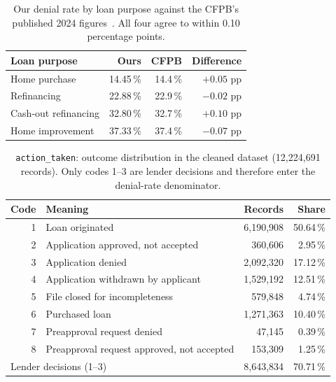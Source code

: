 \documentclass[sigconf,balance=false]{acmart}
\begin{document}
\begin{table}[t]
\caption{Our denial rate by loan purpose against the CFPB's published 2024
         figures~\cite{cpb}. All four agree to within 0.10 percentage points.}
\label{tab:externalpurpose}
\centering
\begin{tabular}{@{}lrrr@{}}
\toprule
Loan purpose & Ours & CFPB & Difference \\
\midrule
Home purchase        & 14.45\,\% & 14.4\,\% & $+0.05$ pp \\
Refinancing          & 22.88\,\% & 22.9\,\% & $-0.02$ pp \\
Cash-out refinancing & 32.80\,\% & 32.7\,\% & $+0.10$ pp \\
Home improvement     & 37.33\,\% & 37.4\,\% & $-0.07$ pp \\
\bottomrule
\end{tabular}
\end{table}

\begin{table}[t]
\caption{\texttt{action\_\allowbreak taken}: outcome distribution in the cleaned
         dataset (12{,}224{,}691 records). Only codes 1--3 are lender decisions
         and therefore enter the denial-rate denominator.}
\label{tab:outcomes}
\centering
\footnotesize
\begin{tabular}{@{}rlrr@{}}
\toprule
Code & Meaning & Records & Share \\
\midrule
1 & Loan originated                        & 6{,}190{,}908 & 50.64\,\% \\
2 & Application approved, not accepted     &   360{,}606 &  2.95\,\% \\
3 & Application denied                    & 2{,}092{,}320 & 17.12\,\% \\
4 & Application withdrawn by applicant     & 1{,}529{,}192 & 12.51\,\% \\
5 & File closed for incompleteness        &   579{,}848 &  4.74\,\% \\
6 & Purchased loan                        & 1{,}271{,}363 & 10.40\,\% \\
7 & Preapproval request denied            &    47{,}145 &  0.39\,\% \\
8 & Preapproval request approved, not accepted & 153{,}309 & 1.25\,\% \\
\midrule
\multicolumn{2}{l}{Lender decisions (1--3)} & 8{,}643{,}834 & 70.71\,\% \\
\bottomrule
\end{tabular}
\end{table}
\end{document}
